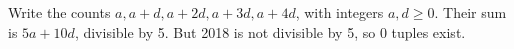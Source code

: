 Write the counts $a,a+d,a+2d,a+3d,a+4d$, with integers $a,d\ge0$. Their sum is $5a+10d$, divisible by 5. But 2018 is not divisible by 5, so $\boxed0$ tuples exist.
